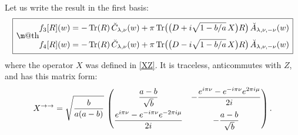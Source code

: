 \documentclass[12pt]{article}
\makeatletter
\newcommand*{\wideboxed}[1]{\setlength{\fboxsep}{1ex}%
  \fbox{\m@th$\displaystyle#1$}}
\DeclareMathOperator{\Tr}{Tr}
\newcommand{\rar}{{\rightarrow}}
\newcommand{\bA}{\breve{A}}
\newcommand{\bC}{\breve{C}}
\makeatother
\begin{document}
Let us write the result in the first basis:
\begin{equation}\label{tpf-34}
\wideboxed{
\begin{aligned}
f_{3}[R](w)&=-\Tr (R)\,\bC_{\lambda,\nu}(w)
+\pi\Tr\bigl(\bigl(D+i\sqrt{1-b/a}\,X\bigr)R\bigr)\,\bA_{\lambda,\nu,-\nu}(w)
\\[3pt]
f_{4}[R](w)&=-\Tr (R)\,\bC_{\lambda,\nu}(w)
+\pi\Tr\bigl(\bigl(D-i\sqrt{1-b/a}\,X\bigr)R\bigr)\,\bA_{\lambda,\nu,-\nu}(w)
\end{aligned}
}
\end{equation}
where the operator $X$ was defined in \eqref{XZ}. It is traceless, anticommutes with $Z$, and has this matrix form:
\begin{equation}
X^{\rar\rar}=\sqrt{\frac{b}{a(a-b)}}\,
\begin{pmatrix}
\dfrac{a-b}{\sqrt{b}} & 
-\dfrac{e^{i\pi\nu}-e^{-i\pi\nu}e^{2\pi i\mu}}{2i}\vspace{4pt}\\
\dfrac{e^{i\pi\nu}-e^{-i\pi\nu}e^{-2\pi i\mu}}{2i} &
-\dfrac{a-b}{\sqrt{b}}
\end{pmatrix}.
\end{equation}
\end{document}
